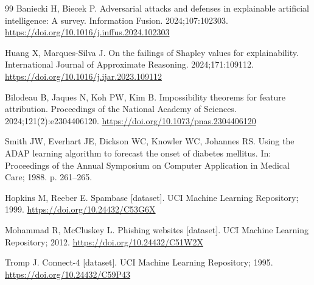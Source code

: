 \documentclass[11pt,a4paper]{article}
\begin{document}
\begin{thebibliography}{99}
Baniecki H, Biecek P. Adversarial attacks and defenses in explainable
artificial intelligence: A survey. Information Fusion. 2024;107:102303.
\url{https://doi.org/10.1016/j.inffus.2024.102303}

Huang X, Marques-Silva J. On the failings of Shapley values for
explainability. International Journal of Approximate Reasoning.
2024;171:109112. \url{https://doi.org/10.1016/j.ijar.2023.109112}

Bilodeau B, Jaques N, Koh PW, Kim B. Impossibility theorems for feature
attribution. Proceedings of the National Academy of Sciences.
2024;121(2):e2304406120. \url{https://doi.org/10.1073/pnas.2304406120}


Smith JW, Everhart JE, Dickson WC, Knowler WC, Johannes RS. Using the ADAP
learning algorithm to forecast the onset of diabetes mellitus. In: Proceedings
of the Annual Symposium on Computer Application in Medical Care; 1988.
p. 261--265.

Hopkins M, Reeber E. Spambase [dataset]. UCI Machine
Learning Repository; 1999. \url{https://doi.org/10.24432/C53G6X}

Mohammad R, McCluskey L. Phishing websites [dataset]. UCI Machine Learning
Repository; 2012. \url{https://doi.org/10.24432/C51W2X}

Tromp J. Connect-4 [dataset]. UCI Machine Learning Repository; 1995.
\url{https://doi.org/10.24432/C59P43}

\end{thebibliography}
\end{document}
